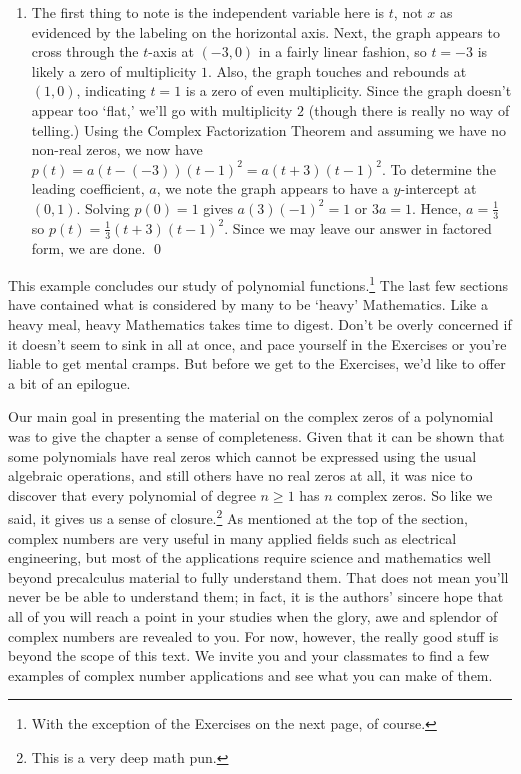 \documentclass{ximera}
\begin{document}
\begin{example}
\begin{enumerate}
\item The first thing to note is the independent variable here is $t$, not $x$ as evidenced by the labeling on the horizontal axis.   Next, the graph appears to cross through the $t$-axis at $(-3,0)$ in a fairly linear fashion, so $t=-3$ is likely a zero of multiplicity $1$.   Also, the graph touches and rebounds at $(1,0)$, indicating $t=1$ is a zero of even multiplicity.  Since the graph doesn't appear too `flat,' we'll go with multiplicity $2$ (though there is really no way of telling.)     Using the Complex Factorization Theorem and assuming we have no non-real zeros, we now have $p(t) = a (t-(-3))(t-1)^2 = a(t+3)(t-1)^2$.  To determine the leading coefficient, $a$, we note the graph appears to have a $y$-intercept at $(0,1)$.  Solving $p(0) = 1$ gives $a(3)(-1)^2 = 1$ or $3a = 1$.  Hence, $a = \frac{1}{3}$ so $p(t) = \frac{1}{3} (t+3)(t-1)^2$. Since we may leave our answer in factored form, we are done. \qed

\end{enumerate}

\end{example}

This example concludes our study of polynomial functions.\footnote{With the exception of the Exercises on the next page, of course.}  The last few sections have contained what is considered by many to be `heavy' Mathematics.  Like a heavy meal, heavy Mathematics takes time to digest.  Don't be overly concerned if it doesn't seem to sink in all at once, and pace yourself in the Exercises or you're liable to get mental cramps.  But before we get to the Exercises, we'd like to offer a bit of an epilogue.  

  

\label{complexepilogue}

Our main goal in presenting the material on the complex zeros of a polynomial was to give the chapter a sense of completeness.  Given that it can be shown that some polynomials have real zeros which cannot be expressed using the usual algebraic operations, and still others have no real zeros at all, it was nice to discover that every polynomial of degree $n \geq 1$ has $n$ complex zeros.  So like we said, it gives us a sense of closure.\footnote{This is a very deep math pun.}  As mentioned at the top of the section, complex numbers are very useful in many applied fields such as electrical engineering,  but most of the applications require science and mathematics well beyond precalculus material to fully understand them.  That does not mean you'll never be be able to understand them; in fact, it is the authors' sincere hope that all of you will reach a point in your studies when the glory, awe and splendor of complex numbers are revealed to you.  For now, however, the really good stuff is beyond the scope of this text. We invite you and your classmates to find a few examples of complex number applications and see what you can make of them. 
\end{document}
